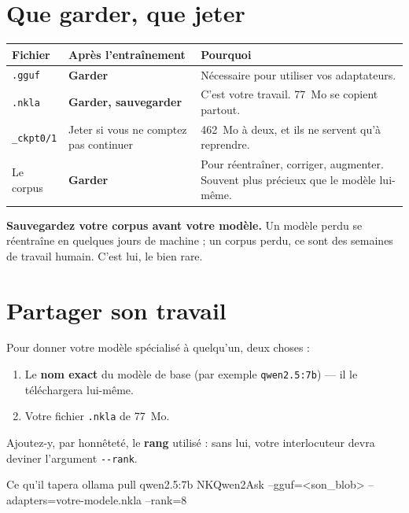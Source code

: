 \section{Que garder, que jeter}

\begin{center}
\begin{tabular}{p{3.4cm}p{4.0cm}p{6.4cm}}
\toprule
\textbf{Fichier} & \textbf{Après l'entraînement} & \textbf{Pourquoi} \\
\midrule
\texttt{.gguf} & \textbf{Garder} & Nécessaire pour utiliser vos adaptateurs. \\
\texttt{.nkla} & \textbf{Garder, sauvegarder} & C'est votre travail. 77~Mo se
   copient partout. \\
\texttt{\_ckpt0/1} & Jeter si vous ne comptez pas continuer & 462~Mo à deux, et
   ils ne servent qu'à reprendre. \\
Le corpus & \textbf{Garder} & Pour réentraîner, corriger, augmenter. Souvent
   plus précieux que le modèle lui-même. \\
\bottomrule
\end{tabular}
\end{center}

\begin{nkpiege}
\textbf{Sauvegardez votre corpus avant votre modèle.} Un modèle perdu se
réentraîne en quelques jours de machine ; un corpus perdu, ce sont des semaines
de travail humain. C'est lui, le bien rare.
\end{nkpiege}

\section{Partager son travail}

Pour donner votre modèle spécialisé à quelqu'un, deux choses :

\begin{enumerate}
  \item Le \textbf{nom exact} du modèle de base (par exemple
        \texttt{qwen2.5:7b}) — il le téléchargera lui-même.
  \item Votre fichier \texttt{.nkla} de 77~Mo.
\end{enumerate}

Ajoutez-y, par honnêteté, le \textbf{rang} utilisé : sans lui, votre
interlocuteur devra deviner l'argument \texttt{-{}-rank}.

\begin{nkcode}[]{Ce qu'il tapera}
ollama pull qwen2.5:7b
NKQwen2Ask --gguf=<son_blob> --adapters=votre-modele.nkla --rank=8
\end{nkcode}

